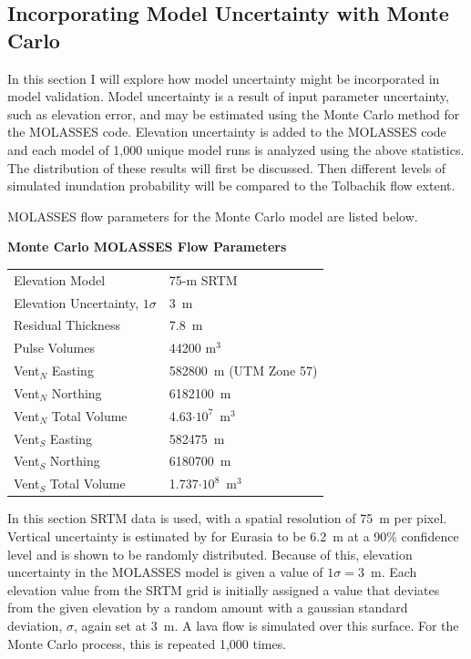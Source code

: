\documentclass[12pt,letter]{article}
\begin{document}
	\subsection{Incorporating Model Uncertainty with Monte Carlo}\label{sec:lava_MC}
		In this section I will explore how model uncertainty might be incorporated in model validation. Model uncertainty is a result of input parameter uncertainty, such as elevation error, and may be estimated using the Monte Carlo method for the MOLASSES code. Elevation uncertainty is added to the MOLASSES code and each model of 1,000 unique model runs is analyzed using the above statistics. The distribution of these results will first be discussed. Then different levels of simulated inundation probability will be compared to the Tolbachik flow extent.

		MOLASSES flow parameters for the Monte Carlo model are listed below. 
		\begin{center}
			\textbf{Monte Carlo MOLASSES Flow Parameters}\\
			\begin{tabular}{l l}
				\toprule
				Elevation Model & 75-m SRTM\\
				Elevation Uncertainty, $1\sigma$ & 3~m\\
				Residual Thickness & 7.8~m\\
				Pulse Volumes & 44200 m$^3$\\
				\midrule
				Vent$_N$ Easting & 582800~m (UTM Zone 57)\\
				Vent$_N$ Northing & 6182100~m\\
				Vent$_N$ Total Volume & 4.63$\cdot10^7$~m$^3$\\
				\midrule
				Vent$_S$ Easting & 582475~m\\
				Vent$_S$ Northing & 6180700~m\\
				Vent$_S$ Total Volume & 1.737$\cdot10^8$~m$^3$\\
				\bottomrule
			\end{tabular}
		\end{center}
		In this section SRTM data is used, with a spatial resolution of 75~m per pixel. Vertical uncertainty is estimated by \citet{rodriguez2006global} for Eurasia to be 6.2~m at a 90\% confidence level and is shown to be randomly distributed. Because of this, elevation uncertainty in the MOLASSES model is given a value of $1\sigma=3$~m. Each elevation value from the SRTM grid is initially assigned a value that deviates from the given elevation by a random amount with a gaussian standard deviation, $\sigma$, again set at 3~m. A lava flow is simulated over this surface. For the Monte Carlo process, this is repeated 1,000 times.
\end{document}
